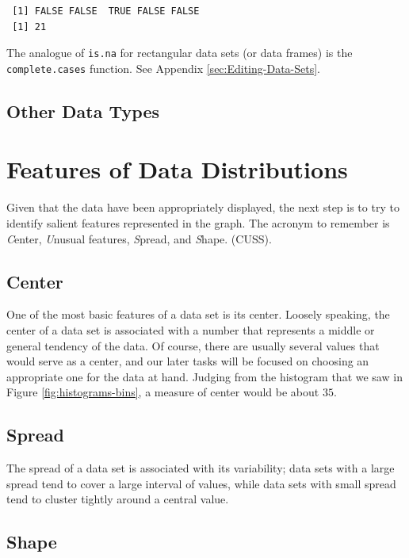 \documentclass[captions=tableheading]{scrbook}
\begin{document}
\begin{verbatim}
 [1] FALSE FALSE  TRUE FALSE FALSE
 [1] 21
\end{verbatim}

The analogue of \texttt{is.na} for rectangular data sets (or data frames) is the \texttt{complete.cases} function. See Appendix \ref{sec:Editing-Data-Sets}.
\subsection{Other Data Types}
\label{sec-2-1-7}

\label{sub:other-data-types}
\section{Features of Data Distributions}
\label{sec-2-2}

\label{sec:features-of-data}

Given that the data have been appropriately displayed, the next step is to try to identify salient features represented in the graph. The acronym to remember is \emph{C}enter, \emph{U}nusual features, \emph{S}pread, and \emph{S}hape. (CUSS).
\subsection{Center}
\label{sec-2-2-1}

\label{sub:Center}

One of the most basic features of a data set is its center. Loosely speaking, the center of a data set is associated with a number that represents a middle or general tendency of the data. Of course, there are usually several values that would serve as a center, and our later tasks will be focused on choosing an appropriate one for the data at hand. Judging from the histogram that we saw in Figure \ref{fig:histograms-bins}, a measure of center would be about \(  35 \). 
\subsection{Spread}
\label{sec-2-2-2}

\label{sub:Spread}

The spread of a data set is associated with its variability; data sets with a large spread tend to cover a large interval of values, while data sets with small spread tend to cluster tightly around a central value. 
\subsection{Shape}
\label{sec-2-2-3}
\end{document}
